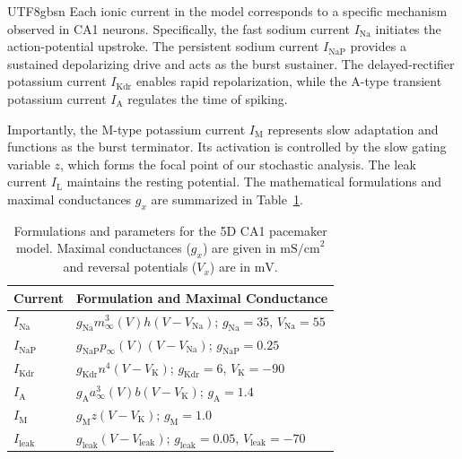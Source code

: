 ﻿\documentclass[reprint, amsmath, amssymb, aps, pre]{revtex4-2}
\begin{document}
\begin{CJK*}{UTF8}{gbsn}
Each ionic current in the model corresponds to a specific mechanism observed in CA1 neurons. Specifically, the fast sodium current $I_{\mathrm{Na}}$ initiates the action-potential upstroke. The persistent sodium current $I_{\mathrm{NaP}}$ provides a sustained depolarizing drive and acts as the burst sustainer. The delayed-rectifier potassium current $I_{\mathrm{Kdr}}$ enables rapid repolarization, while the A-type transient potassium current $I_{\mathrm{A}}$ regulates the time of spiking. 

Importantly, the M-type potassium current $I_{\mathrm{M}}$ represents slow adaptation and functions as the burst terminator. Its activation is controlled by the slow gating variable $z$, which forms the focal point of our stochastic analysis. The leak current $I_{\mathrm{L}}$ maintains the resting potential. The mathematical formulations and maximal conductances $g_x$ are summarized in Table~\ref{tab:currents}.

\begin{table}[htpb]
\caption{Formulations and parameters for the 5D CA1 pacemaker model. Maximal conductances ($g_x$) are given in $\text{mS/cm}^2$ and reversal potentials ($V_x$) are in $\text{mV}$.}
\label{tab:currents}
\begin{ruledtabular} 
\begin{tabular}{l l}  
Current & Formulation and Maximal Conductance \\
\hline 
$I_{\mathrm{Na}}$  & $g_{\mathrm{Na}}m_\infty^3(V)h(V - V_{\mathrm{Na}})$; $g_{\mathrm{Na}} = 35$, $V_{\mathrm{Na}} = 55$ \\
$I_{\mathrm{NaP}}$ & $g_{\mathrm{NaP}}p_\infty(V)(V - V_{\mathrm{Na}})$; $g_{\mathrm{NaP}} = 0.25$ \\
$I_{\mathrm{Kdr}}$ & $g_{\mathrm{Kdr}}n^4(V - V_{\mathrm{K}})$; $g_{\mathrm{Kdr}} = 6$, $V_{\mathrm{K}} = -90$ \\
$I_{\mathrm{A}}$   & $g_{\mathrm{A}}a_\infty^3(V)b(V - V_{\mathrm{K}})$; $g_{\mathrm{A}} = 1.4$ \\
$I_{\mathrm{M}}$   & $g_{\mathrm{M}}z(V - V_{\mathrm{K}})$; $g_{\mathrm{M}} = 1.0$ \\
$I_{\mathrm{leak}}$& $g_{\mathrm{leak}}(V - V_{\mathrm{leak}})$; $g_{\mathrm{leak}} = 0.05$, $V_{\mathrm{leak}} = -70$ \\
\end{tabular}
\end{ruledtabular}
\end{table}


\end{CJK*}
\end{document}
